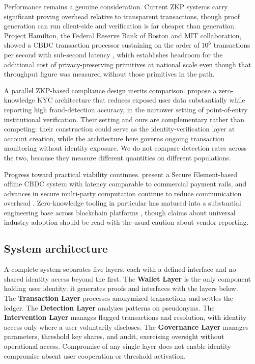 \documentclass[11pt]{article}
\begin{document}
Performance remains a genuine consideration. Current ZKP systems carry significant proving overhead
relative to transparent transactions, though proof generation can run client-side and verification is
far cheaper than generation. Project Hamilton, the Federal Reserve Bank of Boston and MIT
collaboration, showed a CBDC transaction processor sustaining on the order of $10^6$ transactions per
second with sub-second latency \citep{Lovejoy2023Hamilton}, which establishes headroom for the
additional cost of privacy-preserving primitives at national scale even though that throughput figure
was measured without those primitives in the path.

A parallel ZKP-based compliance design merits comparison. \citet{decker2025zkp} propose a
zero-knowledge KYC architecture that reduces exposed user data substantially while reporting high
fraud-detection accuracy, in the narrower setting of point-of-entry institutional verification. Their
setting and ours are complementary rather than competing: their construction could serve as the
identity-verification layer at account creation, while the architecture here governs ongoing
transaction monitoring without identity exposure. We do not compare detection rates across the two,
because they measure different quantities on different populations.

Progress toward practical viability continues. \citet{OfflineCBDC2024} present a Secure Element-based
offline CBDC system with latency comparable to commercial payment rails, and advances in secure
multi-party computation continue to reduce communication overhead \citep{MPC2024}. Zero-knowledge
tooling in particular has matured into a substantial engineering base across blockchain platforms
\citep{ElHajj2024ZKBench}, though claims about universal industry adoption should be read with the
usual caution about vendor reporting.

\subsection{System architecture}

A complete system separates five layers, each with a defined interface and no shared identity access
beyond the first. The \textbf{Wallet Layer} is the only component holding user identity; it generates
proofs and interfaces with the layers below. The \textbf{Transaction Layer} processes anonymized
transactions and settles the ledger. The \textbf{Detection Layer} analyzes patterns on pseudonyms.
The \textbf{Intervention Layer} manages flagged transactions and resolution, with identity access
only where a user voluntarily discloses. The \textbf{Governance Layer} manages parameters, threshold
key shares, and audit, exercising oversight without operational access. Compromise of any single
layer does not enable identity compromise absent user cooperation or threshold activation.
\end{document}
